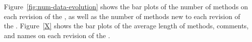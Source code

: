 Figure~\ref{fig:num-data-evolution} shows the bar plots of the number
of methods on each revision of the \dataset, as well as the number of
methods new to each revision of the \dataset.  Figure~\ref{X} shows
the bar plots of the average length of methods, comments, and names on
each revision of the \dataset.
